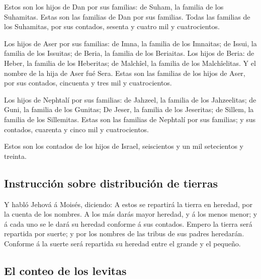  Estos son los hijos de Dan por sus familias: de Suham,
la familia de los Suhamitas. Estas son las familias de Dan por sus
familias.  Todas las familias de los Suhamitas, por sus
contados, sesenta y cuatro mil y cuatrocientos.

 Los hijos de Aser por sus familias: de Imna, la familia
de los Imnaitas; de Issui, la familia de los Issuitas; de Beria, la
familia de los Beriaitas.  Los hijos de Beria: de Heber,
la familia de los Heberitas; de Malchîel, la familia de los
Malchîelitas.  Y el nombre de la hija de Aser fué Sera.
 Estas son las familias de los hijos de Aser, por sus
contados, cincuenta y tres mil y cuatrocientos.

 Los hijos de Nephtalí por sus familias: de Jahzeel, la
familia de los Jahzeelitas; de Guni, la familia de los Gunitas;
 De Jeser, la familia de los Jeseritas; de Sillem, la
familia de los Sillemitas.  Estas son las familias de
Nephtalí por sus familias; y sus contados, cuarenta y cinco mil y
cuatrocientos.

 Estos son los contados de los hijos de Israel,
seiscientos y un mil setecientos y treinta.

\hypertarget{instrucciuxf3n-sobre-distribuciuxf3n-de-tierras}{%
\subsection{Instrucción sobre distribución de
tierras}\label{instrucciuxf3n-sobre-distribuciuxf3n-de-tierras}}

 Y habló Jehová á Moisés, diciendo:  A
estos se repartirá la tierra en heredad, por la cuenta de los nombres.
 A los más darás mayor heredad, y á los menos menor; y á
cada uno se le dará su heredad conforme á sus contados. 
Empero la tierra será repartida por suerte; y por los nombres de las
tribus de sus padres heredarán.  Conforme á la suerte
será repartida su heredad entre el grande y el pequeño.

\hypertarget{el-conteo-de-los-levitas}{%
\subsection{El conteo de los levitas}\label{el-conteo-de-los-levitas}}

